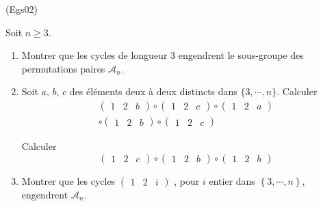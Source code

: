 \begin{tiny}(Egs02)\end{tiny}
Soit $n\geq 3$.
\begin{enumerate}
 \item Montrer que les cycles de longueur $3$ engendrent le sous-groupe des permutations paires $\mathcal{A}_{n}$.
 \item Soit $a$, $b$, $c$ des éléments deux à deux distincts dans $\{3,\cdots,n\}$. Calculer
\begin{multline*}
 \begin{pmatrix}
  1&2&b
 \end{pmatrix}
\circ
 \begin{pmatrix}
  1&2&c
 \end{pmatrix}
\circ
 \begin{pmatrix}
  1&2&a
 \end{pmatrix} \\
\circ
 \begin{pmatrix}
  1&2&b
 \end{pmatrix}
\circ
 \begin{pmatrix}
  1&2&c
 \end{pmatrix}
\end{multline*}

Calculer
\begin{displaymath}
 \begin{pmatrix}
  1&2&c
 \end{pmatrix}
\circ
 \begin{pmatrix}
  1&2&b
 \end{pmatrix}
\circ
 \begin{pmatrix}
  1&2&b
 \end{pmatrix}
\end{displaymath}
\item  Montrer que les cycles
$\begin{pmatrix}
  1&2&i
 \end{pmatrix}
$
, pour $i$ entier dans $\left\{3,\cdots ,n\right\}$, engendrent $\mathcal{A}_{n}$. 
\end{enumerate}
